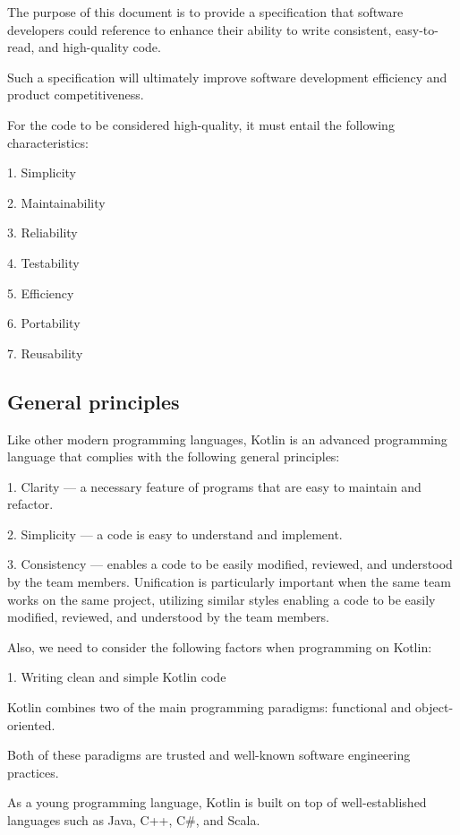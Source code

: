The purpose of this document is to provide a specification that software developers could reference to enhance their ability to write consistent, easy-to-read, and high-quality code.

Such a specification will ultimately improve software development efficiency and product competitiveness.

For the code to be considered high-quality, it must entail the following characteristics:

1.	Simplicity

2.	Maintainability

3.	Reliability

4.	Testability

5.	Efficiency

6.	Portability

7.	Reusability





\subsection*{\textbf{General principles}}



Like other modern programming languages, Kotlin is an advanced programming language that complies with the following general principles:

1.	Clarity — a necessary feature of programs that are easy to maintain and refactor.

2.	Simplicity — a code is easy to understand and implement.

3.	Consistency — enables a code to be easily modified, reviewed, and understood by the team members. Unification is particularly important when the same team works on the same project, utilizing similar styles enabling a code to be easily modified, reviewed, and understood by the team members.



Also, we need to consider the following factors when programming on Kotlin:



1. Writing clean and simple Kotlin code



    Kotlin combines two of the main programming paradigms: functional and object-oriented.

    Both of these paradigms are trusted and well-known software engineering practices.

    As a young programming language, Kotlin is built on top of well-established languages such as Java, C++, C\#, and Scala.

